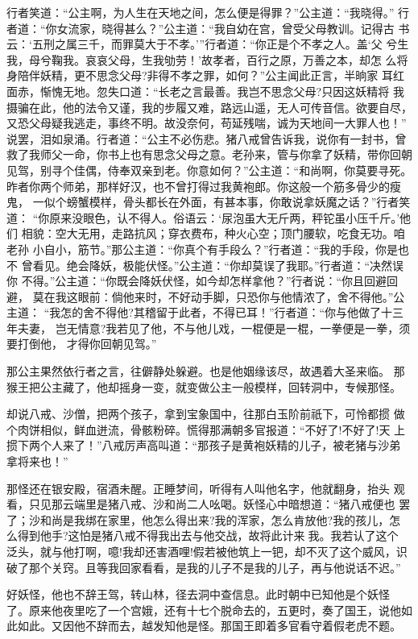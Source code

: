 行者笑道：“公主啊，为人生在天地之间，怎么便是得罪？”公主道：“我晓得。”
行者道：“你女流家，晓得甚么？”公主道：“我自幼在宫，曾受父母教训。记得古
书云：‘五刑之属三千，而罪莫大于不孝。’”行者道：“你正是个不孝之人。盖‘父
兮生我，母兮鞠我。哀哀父母，生我劬劳！’故孝者，百行之原，万善之本，却怎
么将身陪伴妖精，更不思念父母?非得不孝之罪，如何？”公主闻此正言，半晌家
耳红面赤，惭愧无地。忽失口道：“长老之言最善。我岂不思念父母?只因这妖精将
我摄骗在此，他的法令又谨，我的步履又难，路远山遥，无人可传音信。欲要自尽，
又恐父母疑我逃走，事终不明。故没奈何，苟延残喘，诚为天地间一大罪人也！”
说罢，泪如泉涌。行者道：“公主不必伤悲。猪八戒曾告诉我，说你有一封书，曾
救了我师父一命，你书上也有思念父母之意。老孙来，管与你拿了妖精，带你回朝
见驾，别寻个佳偶，侍奉双亲到老。你意如何？”公主道：“和尚啊，你莫要寻死。
昨者你两个师弟，那样好汉，也不曾打得过我黄袍郎。你这般一个筋多骨少的瘦鬼，
一似个螃蟹模样，骨头都长在外面，有甚本事，你敢说拿妖魔之话？”行者笑道：
“你原来没眼色，认不得人。俗语云：‘尿泡虽大无斤两，秤铊虽小压千斤。’他们
相貌：空大无用，走路抗风；穿衣费布，种火心空；顶门腰软，吃食无功。咱老孙
小自小，筋节。”那公主道：“你真个有手段么？”行者道：“我的手段，你是也不
曾看见。绝会降妖，极能伏怪。”公主道：“你却莫误了我耶。”行者道：“决然误你
不得。”公主道：“你既会降妖伏怪，如今却怎样拿他？”行者说：“你且回避回避，
莫在我这眼前：倘他来时，不好动手脚，只恐你与他情浓了，舍不得他。”公主道：
“我怎的舍不得他?其稽留于此者，不得已耳！”行者道：“你与他做了十三年夫妻，
岂无情意?我若见了他，不与他儿戏，一棍便是一棍，一拳便是一拳，须要打倒他，
才得你回朝见驾。”

那公主果然依行者之言，往僻静处躲避。也是他姻缘该尽，故遇着大圣来临。
那猴王把公主藏了，他却摇身一变，就变做公主一般模样，回转洞中，专候那怪。

却说八戒、沙僧，把两个孩子，拿到宝象国中，往那白玉阶前祇下，可怜都掼
做个肉饼相似，鲜血迸流，骨骸粉碎。慌得那满朝多官报道：“不好了!不好了!天
上掼下两个人来了！”八戒厉声高叫道：“那孩子是黄袍妖精的儿子，被老猪与沙弟
拿将来也！”

那怪还在银安殿，宿酒未醒。正睡梦间，听得有人叫他名字，他就翻身，抬头
观看，只见那云端里是猪八戒、沙和尚二人吆喝。妖怪心中暗想道：“猪八戒便也
罢了；沙和尚是我绑在家里，他怎么得出来?我的浑家，怎么肯放他?我的孩儿，怎
么得到他手?这怕是猪八戒不得我出去与他交战，故将此计来我。我若认了这个
泛头，就与他打啊，噫!我却还害酒哩!假若被他筑上一钯，却不灭了这个威风，识
破了那个关窍。且等我回家看看，是我的儿子不是我的儿子，再与他说话不迟。”

好妖怪，他也不辞王驾，转山林，径去洞中查信息。此时朝中已知他是个妖怪
了。原来他夜里吃了一个宫娥，还有十七个脱命去的，五更时，奏了国王，说他如
此如此。又因他不辞而去，越发知他是怪。那国王即着多官看守着假老虎不题。

